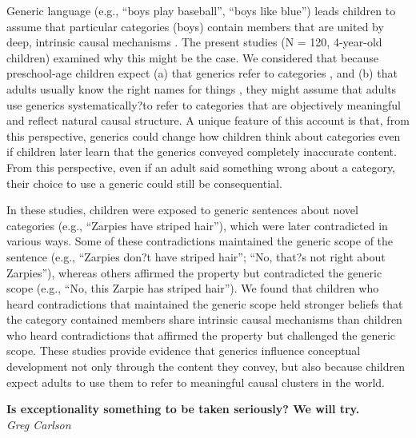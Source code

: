 \documentclass[10pt,letterpaper]{article}
\begin{document}
Generic language (e.g., ``boys play baseball'', ``boys like blue'') leads children to assume that particular categories (boys) contain members that are united by deep, intrinsic causal mechanisms \cite{gelman2010effects, rhodes2012cultural}. 
The present studies (N = 120, 4-year-old children) examined why this might be the case. 
We considered that because preschool-age children expect (a) that generics refer to categories \cite{gelman2003preschool}, and (b) that adults usually know the right names for things \cite{jaswal2007looks}, they might assume that adults use generics systematically?to refer to categories that are objectively meaningful and reflect natural causal structure. 
A unique feature of this account is that, from this perspective, generics could change how children think about categories even if children later learn that the generics conveyed completely inaccurate content. 
From this perspective, even if an adult said something wrong about a category, their choice to use a generic could still be consequential.

In these studies, children were exposed to generic sentences about novel categories (e.g., ``Zarpies have striped hair''), which were later contradicted in various ways. 
Some of these contradictions maintained the generic scope of the sentence (e.g., ``Zarpies don?t have striped hair''; ``No, that?s not right about Zarpies''), whereas others affirmed the property but contradicted the generic scope (e.g., ``No, this Zarpie has striped hair''). 
We found that children who heard contradictions that maintained the generic scope held stronger beliefs that the category contained members share intrinsic causal mechanisms than children who heard contradictions that affirmed the property but challenged the generic scope. 
These studies provide evidence that generics influence conceptual development not only through the content they convey, but also because children expect adults to use them to refer to meaningful causal clusters in the world.

\noindent\textbf{Is exceptionality something to be taken seriously?  We will try.} \\
\noindent\emph{Greg Carlson}
\end{document}
